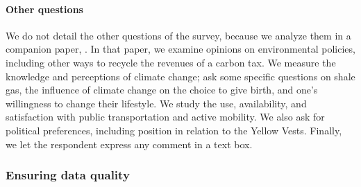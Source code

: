 \documentclass[12pt]{article} %
\begin{document}
\paragraph{Other questions}
We do not detail the other questions of the survey, because we analyze them in a companion paper, \citet{douenne_french_2019}. In that paper, we examine opinions on environmental policies, including other ways to recycle the revenues of a carbon tax. We measure the knowledge and perceptions of climate change; ask some specific questions on shale gas, the influence of climate change on the choice to give birth, and one's willingness to change their lifestyle. We study the use, availability, and satisfaction with public transportation and active mobility. We also ask for political preferences, including position in relation to the Yellow Vests. Finally, we let the respondent express any comment in a text box.

\subsubsection{Ensuring data quality}
\end{document}
